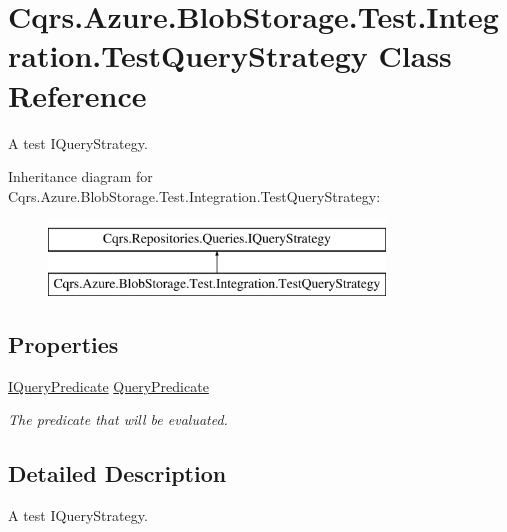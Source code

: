 \hypertarget{classCqrs_1_1Azure_1_1BlobStorage_1_1Test_1_1Integration_1_1TestQueryStrategy}{}\section{Cqrs.\+Azure.\+Blob\+Storage.\+Test.\+Integration.\+Test\+Query\+Strategy Class Reference}
\label{classCqrs_1_1Azure_1_1BlobStorage_1_1Test_1_1Integration_1_1TestQueryStrategy}


A test I\+Query\+Strategy.  


Inheritance diagram for Cqrs.\+Azure.\+Blob\+Storage.\+Test.\+Integration.\+Test\+Query\+Strategy\+:\begin{figure}[H]
\begin{center}
\leavevmode
\includegraphics[height=2.000000cm]{classCqrs_1_1Azure_1_1BlobStorage_1_1Test_1_1Integration_1_1TestQueryStrategy}
\end{center}
\end{figure}
\subsection*{Properties}
\begin{DoxyCompactItemize}
\item 
\hyperlink{interfaceCqrs_1_1Repositories_1_1Queries_1_1IQueryPredicate}{I\+Query\+Predicate} \hyperlink{classCqrs_1_1Azure_1_1BlobStorage_1_1Test_1_1Integration_1_1TestQueryStrategy_ab2a9657b5f1ce73aa3f807dd069c3d30_ab2a9657b5f1ce73aa3f807dd069c3d30}{Query\+Predicate}
\begin{DoxyCompactList}\small\item\em The predicate that will be evaluated. \end{DoxyCompactList}\end{DoxyCompactItemize}


\subsection{Detailed Description}
A test I\+Query\+Strategy. 



